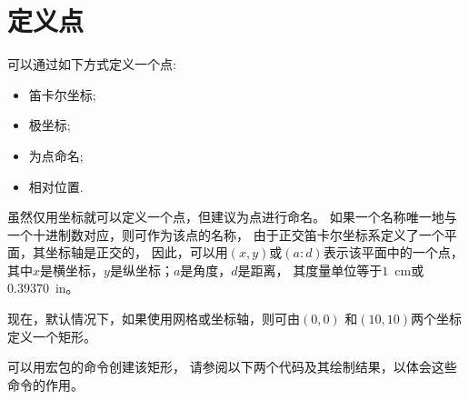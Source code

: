 \documentclass[../main.tex]{subfiles}
\begin{document}
\section{定义点}

可以通过如下方式定义一个点:
\begin{itemize}
\item 笛卡尔坐标;
\item 极坐标;
\item 为点命名;
\item 相对位置.
\end{itemize}

虽然仅用坐标就可以定义一个点，但建议为点进行命名。
如果一个名称唯一地与一个十进制数对应，则可作为该点的名称，
由于正交笛卡尔坐标系定义了一个平面，其坐标轴是正交的，
因此，可以用$(x,y)$或$(a:d)$表示该平面中的一个点，其中$x$是横坐标，$y$是纵坐标；$a$是角度，$d$是距离，
其度量单位等于$1$~cm或$0.39370$~in。

现在，默认情况下，如果使用网格或坐标轴，则可由$(0,0)$ 和$(10,10)$两个坐标定义一个矩形。

可以用宏包的命令创建该矩形，
请参阅以下两个代码及其绘制结果，以体会这些命令的作用。
\end{document}
